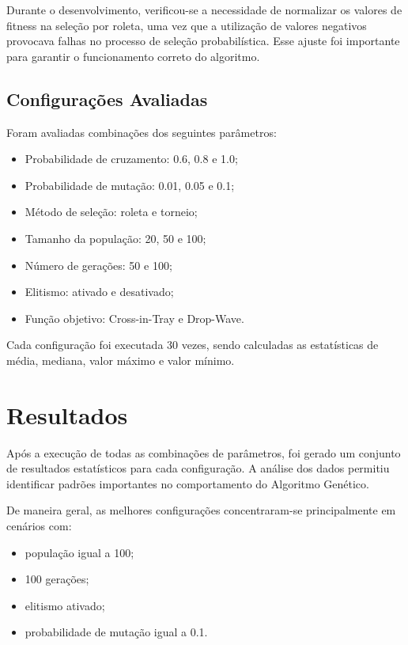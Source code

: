 \documentclass[a4paper,12pt]{article}
\begin{document}
Durante o desenvolvimento, verificou-se a necessidade de normalizar os valores de fitness na seleção por roleta, uma vez que a utilização de valores negativos provocava falhas no processo de seleção probabilística. Esse ajuste foi importante para garantir o funcionamento correto do algoritmo.

\subsection{Configurações Avaliadas}

Foram avaliadas combinações dos seguintes parâmetros:

\begin{itemize}
    \item Probabilidade de cruzamento: 0.6, 0.8 e 1.0;
    \item Probabilidade de mutação: 0.01, 0.05 e 0.1;
    \item Método de seleção: roleta e torneio;
    \item Tamanho da população: 20, 50 e 100;
    \item Número de gerações: 50 e 100;
    \item Elitismo: ativado e desativado;
    \item Função objetivo: Cross-in-Tray e Drop-Wave.
\end{itemize}

Cada configuração foi executada 30 vezes, sendo calculadas as estatísticas de média, mediana, valor máximo e valor mínimo.


\section{Resultados}

Após a execução de todas as combinações de parâmetros, foi gerado um conjunto de resultados estatísticos para cada configuração. A análise dos dados permitiu identificar padrões importantes no comportamento do Algoritmo Genético.

De maneira geral, as melhores configurações concentraram-se principalmente em cenários com:

\begin{itemize}
    \item população igual a 100;
    \item 100 gerações;
    \item elitismo ativado;
    \item probabilidade de mutação igual a 0.1.
\end{itemize}
\end{document}
